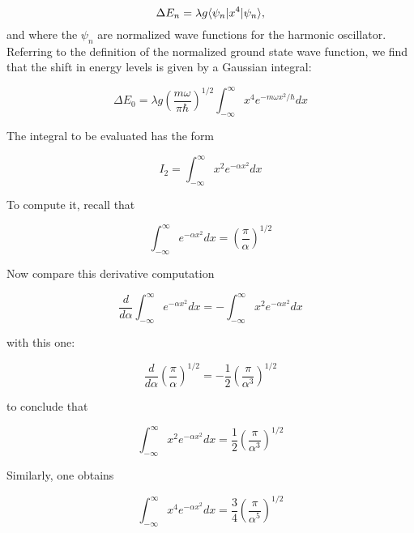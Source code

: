 \begin{equation}
\label{DeltaEn]}
\Delta E_n = \lambda g \langle \psi_n | x^4 | \psi_n \rangle ,
\end{equation}
and where the $\psi_n$ are normalized wave functions for the harmonic oscillator.  Referring to the definition of the normalized ground state wave function, we find that the shift in energy levels is given by a Gaussian integral:

\begin{equation}
\Delta E_0 = \lambda g \left(\frac{m\omega}{\pi\hbar}\right)^{ 1/2 } \int_{-\infty}^\infty x^4 e^{-m\omega x^2 / \hbar} dx
\end{equation}

The integral to be evaluated has the form

\begin{equation}
I_2 = \int_{-\infty}^\infty x^2 e^{-\alpha x^2} dx
\end{equation}

To compute it, recall that

\begin{equation}
\int_{-\infty}^\infty e^{-\alpha x^2} dx
= \left( \frac{\pi}{\alpha} \right)^{1/2}
\end{equation}

Now compare this derivative computation

\begin{equation}
\frac{d}{d\alpha} \int_{-\infty}^\infty e^{-\alpha x^2} dx = - \int_{-\infty}^\infty x^2 e^{-\alpha x^2} dx
\end{equation}

with this one:

\begin{equation}
\frac{d}{d\alpha} \left(\frac{\pi}{\alpha}\right)^{1/2} = -\frac{1}{2}\left(\frac{\pi}{ \alpha^3 } \right)^{1/2}
\end{equation}

to conclude that

\begin{equation}
 \int_{-\infty}^\infty x^2 e^{-\alpha x^2} dx =  \frac{1}{2}\left(\frac{\pi}{ \alpha^3 } \right)^{1/2}
\end{equation}

Similarly, one obtains

\begin{equation}
 \int_{-\infty}^\infty x^4 e^{-\alpha x^2} dx =  \frac{3}{4}\left(\frac{\pi}{ \alpha^5 } \right)^{1/2}
\end{equation}

